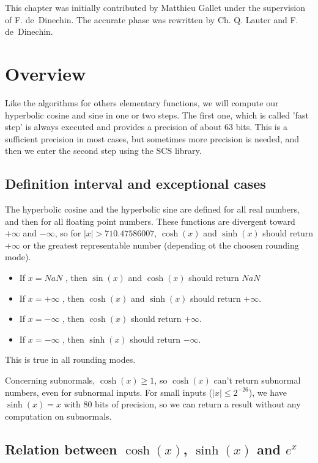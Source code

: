This chapter was initially contributed by Matthieu Gallet under the
supervision of F. de~Dinechin. The accurate phase was rewritten by Ch.
Q. Lauter and F. de~Dinechin.


\section{Overview}

Like the algorithms for others elementary functions, we will compute
our hyperbolic cosine and sine in one or two steps.  The first one,
which is called 'fast step' is always executed and provides a
precision of about 63 bits.  This is a sufficient precision in most
cases, but sometimes more precision is needed, and then we enter the
second step using the SCS library. 



\subsection{Definition interval and exceptional cases}
The hyperbolic cosine and the hyperbolic sine are defined for all real
numbers, and then for all floating point numbers.  These functions are
divergent toward $+\infty$ and $-\infty$, so for $|x| > 710.47586007$,
$\cosh(x)$ and $\sinh(x)$ should return $+\infty$ or the greatest
representable number (depending ot the choosen rounding mode).

\begin{itemize}
\item If $x = NaN$ , then $\sin(x)$ and $\cosh(x)$ should return $NaN$
\item If $x = +\infty$ , then $\cosh(x)$ and $\sinh(x)$ should return $+\infty$. 
\item If $x = -\infty$ , then $\cosh(x)$ should return $+\infty$. 
\item If $x = -\infty$ , then $\sinh(x)$ should return $-\infty$. 
\end{itemize}

This is true in all rounding modes.

Concerning subnormals, $\cosh(x) \geq 1$, so $\cosh(x)$ can't return
subnormal numbers, even for subnormal inputs.  For small inputs ($|x|
\leq 2^{-26}$), we have $\sinh(x) = x$ with 80 bits of precision, so
we can return a result without any computation on subnormals.

\subsection{Relation between $\cosh(x)$, $\sinh(x)$ and $e^x$}

